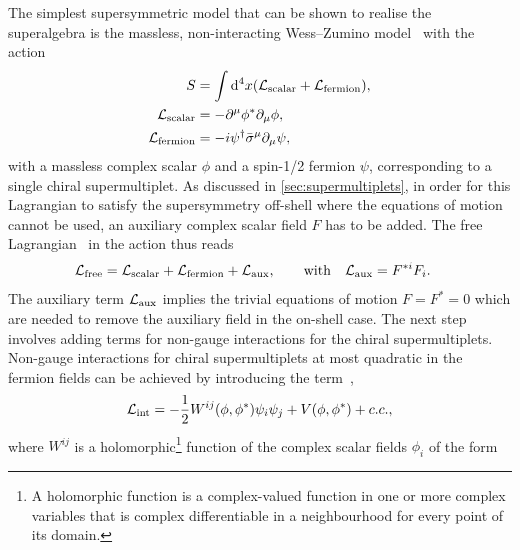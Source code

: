 The simplest supersymmetric model that can be shown to realise the superalgebra is the massless, non-interacting Wess--Zumino model~\cite{Wess:1974tw} with the action~\cite{Bustamante:2009us,Martin:1997ns} 
\begin{equation}
\begin{split}
S & = \int \mathop{}\!\mathrm{d}^4x(\mathcal{L}_\mathrm{scalar} + \mathcal{L}_\mathrm{fermion}), \\
	\mathcal{L}_\mathrm{scalar} & = - \partial^\mu\phi^*\partial_\mu\phi, \\
	\mathcal{L}_\mathrm{fermion} & = - i\psi^\dagger\bar{\sigma}^\mu\partial_\mu\psi , \\
	\label{eq:wess_zumino_free}
\end{split}
\end{equation}
with a massless complex scalar $\phi$ and a spin-1/2 fermion $\psi$, corresponding to a single chiral supermultiplet. As discussed in \cref{sec:supermultiplets}, in order for this Lagrangian to satisfy the supersymmetry off-shell where the equations of motion cannot be used, an auxiliary complex scalar field $F$ has to be added. The free Lagrangian~\cite{Bustamante:2009us} in the action thus reads
\begin{equation}
\begin{split}
	\mathcal{L}_\mathrm{free} & = \mathcal{L}_\mathrm{scalar} + \mathcal{L}_\mathrm{fermion} + \mathcal{L}_\mathrm{aux},  \qquad \mathrm{with} \quad \mathcal{L}_\mathrm{aux} = F^{*i}F_i.
\end{split}
\label{eq:free_wess_zumino}
\end{equation} 
The auxiliary term $\mathcal{L}_\mathrm{aux}$ implies the trivial equations of motion $F = F^* = 0$ which are needed to remove the auxiliary field in the on-shell case. The next step involves adding terms for non-gauge interactions for the chiral supermultiplets. Non-gauge interactions for chiral supermultiplets at most quadratic in the fermion fields can be achieved by introducing the term~\cite{Bustamante:2009us},
\begin{equation}
	\mathcal{L}_\mathrm{int} = - \frac{1}{2}W^{ij}(\phi,\phi^*)\psi_i \psi_j + V(\phi,\phi^*) + c.c.,
	\label{eq:wess_zumino_int}
\end{equation}
where $W^{ij}$ is a holomorphic\footnote{A holomorphic function is a complex-valued function in one or more complex variables that is complex differentiable in a neighbourhood for every point of its domain.} function of the complex scalar fields $\phi_i$ of the form~\cite{Bustamante:2009us}
